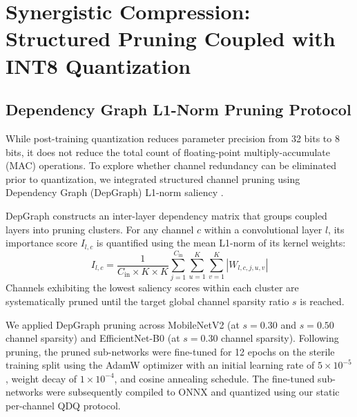\documentclass{jcse}
\begin{document}
\section{Synergistic Compression: Structured Pruning Coupled with INT8 Quantization}

\subsection{Dependency Graph L1-Norm Pruning Protocol}
While post-training quantization reduces parameter precision from 32 bits to 8 bits, it does not reduce the total count of floating-point multiply-accumulate (MAC) operations. To explore whether channel redundancy can be eliminated prior to quantization, we integrated structured channel pruning using Dependency Graph (DepGraph) L1-norm saliency \cite{fang2023depgraph}.

DepGraph constructs an inter-layer dependency matrix that groups coupled layers into pruning clusters. For any channel $c$ within a convolutional layer $l$, its importance score $I_{l,c}$ is quantified using the mean L1-norm of its kernel weights:
\begin{equation}
I_{l,c} = \frac{1}{C_{\text{in}} \times K \times K} \sum_{j=1}^{C_{\text{in}}} \sum_{u=1}^K \sum_{v=1}^K |W_{l,c,j,u,v}|
\end{equation}
Channels exhibiting the lowest saliency scores within each cluster are systematically pruned until the target global channel sparsity ratio $s$ is reached.

We applied DepGraph pruning across MobileNetV2 (at $s = 0.30$ and $s = 0.50$ channel sparsity) and EfficientNet-B0 (at $s = 0.30$ channel sparsity). Following pruning, the pruned sub-networks were fine-tuned for 12 epochs on the sterile training split using the AdamW optimizer with an initial learning rate of $5 \times 10^{-5}$, weight decay of $1 \times 10^{-4}$, and cosine annealing schedule. The fine-tuned sub-networks were subsequently compiled to ONNX and quantized using our static per-channel QDQ protocol.
\end{document}

